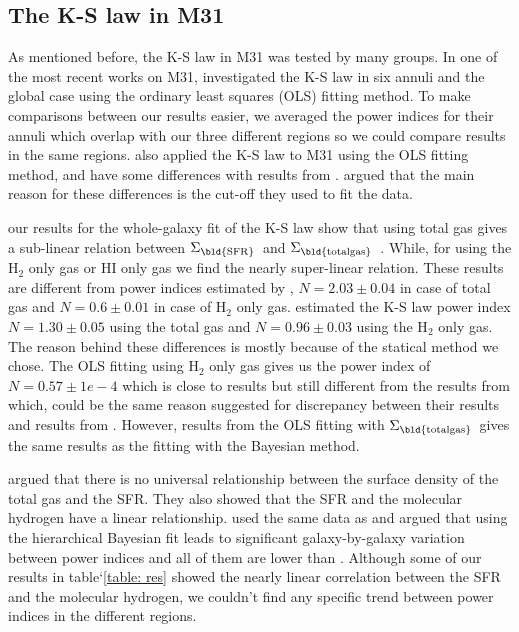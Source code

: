 \documentclass[useAMS,usenatbib]{mn2e}
\newcommand \sigmatotalgas {$\Sigma_{\rm \bld {total gas }} $\ }
\newcommand \sigmasfr     {$\Sigma_{\rm \bld {SFR }} $\ }
\begin{document}
\subsection{The K-S law in M31}

As mentioned before, the K-S law in M31 was tested by many groups. In one of the most recent works on M31, \cite{Ford13} investigated the K-S law in six annuli and the global case using the ordinary least squares (OLS) fitting method. To make comparisons between our results easier, we averaged the power indices for their annuli which overlap with our three different regions so we could compare results in the same regions.
\cite{Tabatabaei10} also applied the K-S law to M31 using the OLS fitting method, and have some differences with results from \cite{Ford13}. \cite{Ford13} argued that the main reason for these differences is the cut-off they used to fit the data. 
 
our results for the whole-galaxy fit of the K-S law show that using total gas gives a sub-linear relation between \sigmasfr and \sigmatotalgas. While, for using the H$_{2}$ only gas or HI only gas we find the nearly super-linear relation. These results are different from power indices estimated by \cite{Ford13}, $N=2.03\pm0.04$ in case of total gas and $N=0.6\pm0.01$ in case of H$_{2}$ only gas. \cite{Tabatabaei10} estimated the K-S law power index $N=1.30\pm0.05$ using the total gas and $N=0.96\pm0.03$ using the H$_{2}$ only gas. The reason behind these differences is mostly because of the statical method we chose. The OLS fitting using H$_{2}$ only gas gives us the power index of $N=0.57\pm1e-4$ which is close to \cite{Ford13} results but still different from the results from \cite{Tabatabaei10} which, could be the same reason \cite{Ford13} suggested for discrepancy between their results and results from \cite{Tabatabaei10}. However, results from the OLS fitting with \sigmatotalgas gives the same results as the fitting with the Bayesian method.%

 \cite{Bigiel08} argued that there is no universal relationship between the surface density of the total gas and the SFR. They also showed that the SFR and the molecular hydrogen have a linear relationship. \cite{Shetty13} used the same data as \cite{Bigiel08} and argued that using the hierarchical Bayesian fit leads to significant galaxy-by-galaxy variation between power indices and all of them are lower than \cite{Bigiel08}. Although some of our results in table`\ref{table: res} showed the nearly linear correlation between the SFR and the molecular hydrogen, we couldn't find any specific trend between power indices in the different regions. 
\end{document}
